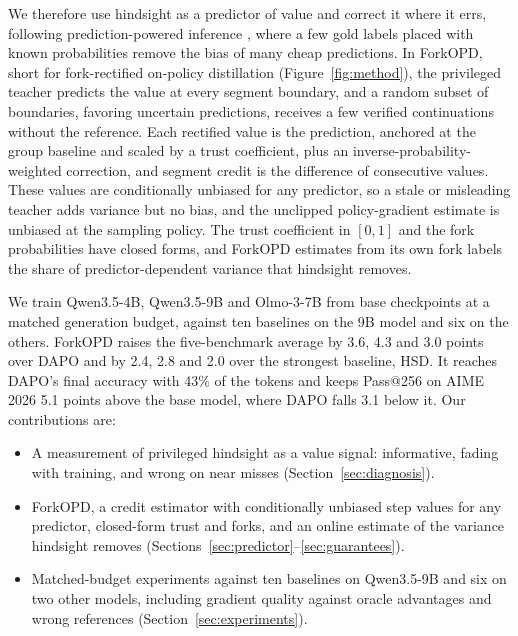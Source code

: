 \documentclass[11pt]{article}
\newcommand{\method}{ForkOPD}
\theoremstyle{remark}
\begin{document}
We therefore use hindsight as a predictor of value and correct it where it errs, following prediction-powered inference \citep{angelopoulos2023ppi,zrnic2024active}, where a few gold labels placed with known probabilities remove the bias of many cheap predictions. In \method{}, short for fork-rectified on-policy distillation (Figure~\ref{fig:method}), the privileged teacher predicts the value at every segment boundary, and a random subset of boundaries, favoring uncertain predictions, receives a few verified continuations without the reference. Each rectified value is the prediction, anchored at the group baseline and scaled by a trust coefficient, plus an inverse-probability-weighted correction, and segment credit is the difference of consecutive values. These values are conditionally unbiased for any predictor, so a stale or misleading teacher adds variance but no bias, and the unclipped policy-gradient estimate is unbiased at the sampling policy. The trust coefficient in $[0,1]$ and the fork probabilities have closed forms, and \method{} estimates from its own fork labels the share of predictor-dependent variance that hindsight removes.

We train Qwen3.5-4B, Qwen3.5-9B \citep{qwen35} and Olmo-3-7B \citep{olmo2025olmo3} from base checkpoints at a matched generation budget, against ten baselines on the 9B model and six on the others. \method{} raises the five-benchmark average by 3.6, 4.3 and 3.0 points over DAPO and by 2.4, 2.8 and 2.0 over the strongest baseline, HSD. It reaches DAPO's final accuracy with 43\% of the tokens and keeps Pass@256 on AIME 2026 5.1 points above the base model, where DAPO falls 3.1 below it. Our contributions are:
\begin{itemize}
\item A measurement of privileged hindsight as a value signal: informative, fading with training, and wrong on near misses (Section~\ref{sec:diagnosis}).
\item \method{}, a credit estimator with conditionally unbiased step values for any predictor, closed-form trust and forks, and an online estimate of the variance hindsight removes (Sections~\ref{sec:predictor}--\ref{sec:guarantees}).
\item Matched-budget experiments against ten baselines on Qwen3.5-9B and six on two other models, including gradient quality against oracle advantages and wrong references (Section~\ref{sec:experiments}).
\end{itemize}


\end{document}
